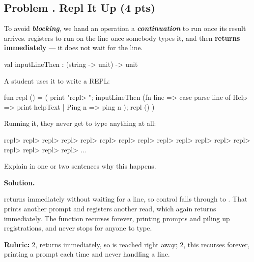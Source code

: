 \documentclass[crop=false]{standalone}
\newif\ifsol
\newenvironment{solution}
    {\par\color{solution_color}\begin{framed}\textbf{Solution.}\par}
    {\end{framed}}
\newcommand{\term}[1]{\textbf{\textit{#1}}}
\newcommand{\quizproblem}[3]{%
  \needspace{5\baselineskip}%
  \stepcounter{problem}%
  \ifsol
    \subsection*{Problem \arabic{problem}. #1 \hfill \timing{#2} \quad (#3 pts)}%
  \else
    \subsection*{Problem \arabic{problem}. #1 \hfill (#3 pts)}%
  \fi
}
\newcommand{\answerspace}[1]{\ifsol\else\vspace{#1}\par\fi}
\begin{document}
\newpage


\quizproblem{Repl It Up}{6}{4}

To avoid \term{blocking}, we hand an operation a \term{continuation} to
run once its result arrives.  registers 
to run on the line once somebody types it, and then \textbf{returns
immediately} --- it does not wait for the line.

\begin{codeblock}
  val inputLineThen : (string -> unit) -> unit
\end{codeblock}

A student uses it to write a REPL:

\begin{codeblock}
  fun repl () =
    ( print "repl> ";
      inputLineThen (fn line =>
        case parse line of
          Help   => print helpText
        | Ping n => ping n
      );
      repl ()
    )
\end{codeblock}

Running it, they never get to type anything at all:

\begin{codeblock}[language={}]
  repl> repl> repl> repl> repl> repl> repl> repl> repl>
  repl> repl> repl> repl> repl> repl> repl> repl> ...
\end{codeblock}

Explain in one or two sentences why this happens.

\answerspace{4cm}

\begin{solution}
 returns immediately without waiting for a line, so
control falls through to . That prints another prompt and
registers another read, which again returns immediately. The function
recurses forever, printing prompts and piling up registrations, and
never stops for anyone to type.

\textbf{Rubric:} 2,  returns immediately, so
 is reached right away; 2, this recurses forever, printing
a prompt each time and never handling a line.
\end{solution}

\end{document}

